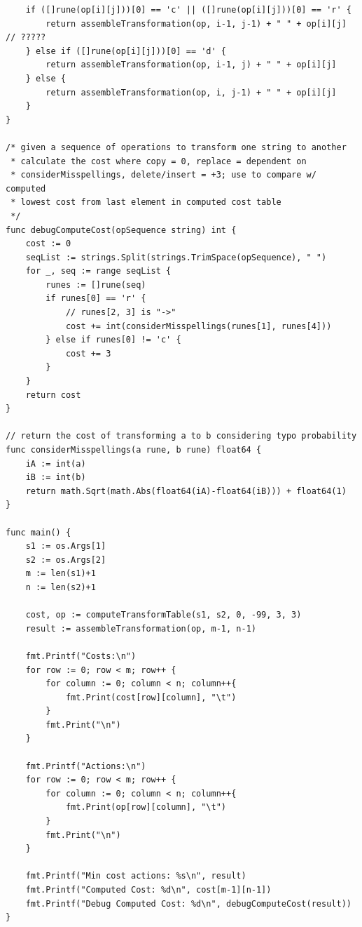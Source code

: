 \documentclass[12pt,letterpaper]{article}
\begin{document}
\begin{scriptsize}
\begin{verbatim}
    if ([]rune(op[i][j]))[0] == 'c' || ([]rune(op[i][j]))[0] == 'r' {
        return assembleTransformation(op, i-1, j-1) + " " + op[i][j] // ?????
    } else if ([]rune(op[i][j]))[0] == 'd' {
        return assembleTransformation(op, i-1, j) + " " + op[i][j]
    } else {
        return assembleTransformation(op, i, j-1) + " " + op[i][j]
    }
}

/* given a sequence of operations to transform one string to another
 * calculate the cost where copy = 0, replace = dependent on 
 * considerMisspellings, delete/insert = +3; use to compare w/ computed
 * lowest cost from last element in computed cost table
 */
func debugComputeCost(opSequence string) int {
    cost := 0
    seqList := strings.Split(strings.TrimSpace(opSequence), " ")
    for _, seq := range seqList {
        runes := []rune(seq)
        if runes[0] == 'r' {
            // runes[2, 3] is "->"
            cost += int(considerMisspellings(runes[1], runes[4]))
        } else if runes[0] != 'c' {
            cost += 3
        }
    }
    return cost
}

// return the cost of transforming a to b considering typo probability
func considerMisspellings(a rune, b rune) float64 {
    iA := int(a)
    iB := int(b)
    return math.Sqrt(math.Abs(float64(iA)-float64(iB))) + float64(1)
}

func main() {
    s1 := os.Args[1]
    s2 := os.Args[2]
    m := len(s1)+1
    n := len(s2)+1
    
    cost, op := computeTransformTable(s1, s2, 0, -99, 3, 3)
    result := assembleTransformation(op, m-1, n-1)
    
    fmt.Printf("Costs:\n")
    for row := 0; row < m; row++ {
        for column := 0; column < n; column++{
            fmt.Print(cost[row][column], "\t")
        }
        fmt.Print("\n")
    } 
    
    fmt.Printf("Actions:\n")
    for row := 0; row < m; row++ {
        for column := 0; column < n; column++{
            fmt.Print(op[row][column], "\t")
        }
        fmt.Print("\n")
    } 
    
    fmt.Printf("Min cost actions: %s\n", result)
    fmt.Printf("Computed Cost: %d\n", cost[m-1][n-1])
    fmt.Printf("Debug Computed Cost: %d\n", debugComputeCost(result))
}
        \end{verbatim}
    \end{scriptsize}

\pagebreak
\end{document}
